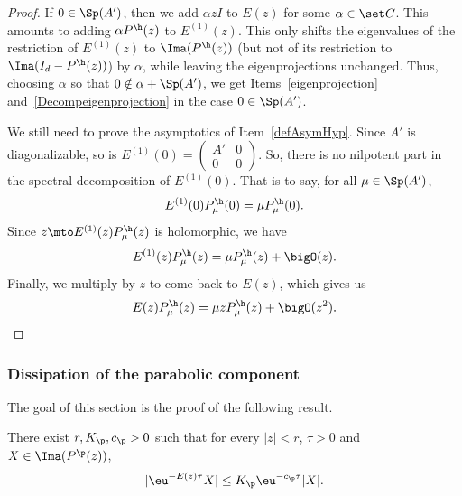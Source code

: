 \begin{proof}
If $0\in\Sp(A')$, then we add $\alpha zI$ to $E(z)$ for some $\alpha\in\set C$. This amounts to adding $\alpha P^\h(z)$ to $E^{(1)}(z)$. This only shifts the eigenvalues of the restriction of $E^{(1)}(z)$ to $\Ima(P^\h(z))$ (but not of its restriction to $\Ima(I_d-P^\h(z))$) by $\alpha$, while leaving the eigenprojections unchanged. Thus, choosing $\alpha$ so that $0\notin \alpha+\Sp(A')$, we get Items~\eqref{eigenprojection} and~\eqref{Decompeigenprojection} in the case $0\in\Sp(A')$.

We still need to prove the asymptotics of Item~\eqref{defAsymHyp}. Since $A'$ is diagonalizable, so is $E^{(1)}(0) = (\begin{smallmatrix} A'&0\\0&0 \end{smallmatrix})$. So, there is no nilpotent part in the spectral decomposition of $E^{(1)}(0)$. That is to say, for all $\mu\in\Sp(A')$,
\[
E^{(1)}(0)P_\mu^\h(0) = \mu P_\mu^\h(0).
\]
Since $z\mto E^{(1)}(z)P_\mu^\h(z)$ is holomorphic, we have
\[
E^{(1)}(z)P_\mu^\h(z) = \mu P_\mu^\h(z)+\bigO(z).
\]
Finally, we multiply by $z$ to come back to $E(z)$, which gives us
\[
E(z)P_\mu^\h(z) = \mu zP_\mu^\h(z)+\bigO(z^2).\qedhere
\]
\end{proof}

\label{subsubsec:EF_WP}

\subsubsection{Dissipation of the parabolic component}\label{subsubsec:dissipation}

The goal of this section is the proof of the following result.

\begin{prop} \label{Prop:dissip_p}
There exist $r, K_\p, c_\p >0$ such that for every $|z|<r$, $\tau >0$ and $X\in\Ima(P^\p(z))$,
\[
|\eu^{- E(z) \tau} X | \leq K_\p \eu^{-c_\p \tau} |X|.
\]
\end{prop}

